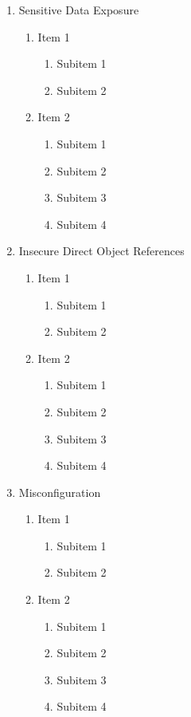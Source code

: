 \documentclass[12pt, letter-paper]{article}
\begin{document}
\begin{enumerate}
\item Sensitive Data Exposure
  \begin{enumerate}
  \item Item 1
    \begin{enumerate}
    \item Subitem 1
    \item Subitem 2
    \end{enumerate}
  \item Item 2
    \begin{enumerate}
    \item Subitem 1
    \item Subitem 2
    \item Subitem 3
    \item Subitem 4
    \end{enumerate}
  \end{enumerate}

\item Insecure Direct Object References
  \begin{enumerate}
  \item Item 1
    \begin{enumerate}
    \item Subitem 1
    \item Subitem 2
    \end{enumerate}
  \item Item 2
    \begin{enumerate}
    \item Subitem 1
    \item Subitem 2
    \item Subitem 3
    \item Subitem 4
    \end{enumerate}
  \end{enumerate}

\item Misconfiguration
  \begin{enumerate}
  \item Item 1
    \begin{enumerate}
    \item Subitem 1
    \item Subitem 2
    \end{enumerate}
  \item Item 2
    \begin{enumerate}
    \item Subitem 1
    \item Subitem 2
    \item Subitem 3
    \item Subitem 4
    \end{enumerate}
  \end{enumerate}


\end{enumerate}
\end{document}
